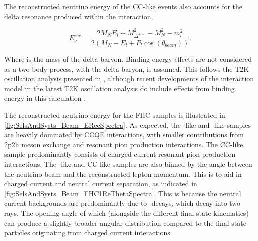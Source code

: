 The reconstructed neutrino energy of the CC\quickmath{1\pi^{+}}-like events also accounts for the delta resonance produced within the interaction,

\begin{equation}
  \label{sec:SelsAndSysts_Erec_CCRES}
  E^{rec}_{\nu} = \frac{2M_{N}E_{l} + M_{\Delta^{++}}^{2} - M_{N}^{2} - m_{l}^{2}}{2(M_{N} - E_{l} + P_{l}\cos(\theta_{beam}))}.
\end{equation}

Where  is the mass of the delta baryon. Binding energy effects are not considered as a two-body process, with the delta baryon, is assumed. This follows the T2K oscillation analysis presented in \cite{Dunne2020-uf}, although recent developments of the interaction model in the latest T2K oscillation analysis do include effects from binding energy in this calculation \cite{t2k_tn_414}.

The reconstructed neutrino energy for the FHC samples is illustrated in \autoref{fig:SelsAndSysts_Beam_ERecSpectra}. As expected, the -like and -like samples are heavily dominated by CCQE interactions, with smaller contributions from 2p2h meson exchange and resonant pion production interactions. The CC\quickmath{1\pi^{+}}-like sample predominantly consists of charged current resonant pion production interactions. The -like and CC\quickmath{1\pi^{+}}-like samples are also binned by the angle between the neutrino beam and the reconstructed lepton momentum. This is to aid in charged current and neutral current separation, as indicated in \autoref{fig:SelsAndSysts_Beam_FHC1ReThetaSpectra}. This is because the neutral current backgrounds are predominantly due to -decays, which decay into two \quickmath{\gamma} rays. The opening angle of which (alongside the different final state kinematics) can produce a slightly broader angular distribution compared to the final state particles originating from charged current  interactions.

